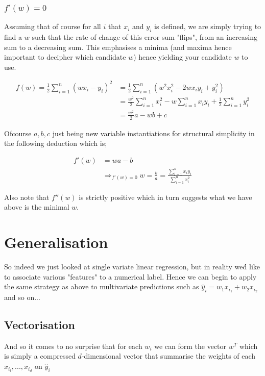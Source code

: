 \documentclass{article}
\begin{document}
\subsubsection*{$f'(w) = 0$}
Assuming that of course for all $i$ that $x_i$ and $y_i$ is defined, we are simply trying to find a $w$ such that the rate of change of this error sum "flips", from an increasing sum to a decreasing sum. This emphasises a minima (and maxima hence important to decipher which candidate $w$) hence yielding your candidate $w$ to use.

\begin{align*}
	f(w) = \frac{1}{2}\sum_{i=1}^{n}(wx_i-y_i)^2 &= \frac{1}{2}\sum_{i=1}^{n} (w^2x_i^2 - 2wx_iy_i + y_i^2) \\
																							 &= \frac{w^2}{2}\sum_{i=1}^{n}x_i^2 - w \sum_{i=1}^{n}x_iy_i + \frac{1}{2}\sum_{i=1}^{n}y_i^2 \\
																							 &= \frac{w^2}{2}a - wb + c
\end{align*}

Ofcourse $a,b,c$ just being new variable instantiations for structural simplicity in the following deduction which is; 

\begin{align*}
	f'(w) &= wa - b \\
				&\Rightarrow_{f'(w) = 0} w = \frac{b}{a} = \frac{\sum_{i=1}^{n}x_iy_i}{\sum_{i=1}^{n}x_i^2}
\end{align*}

Also note that $f''(w)$ is strictly positive which in turn suggests what we have above is the minimal $w$.

\section*{Generalisation}
So indeed we just looked at single variate linear regression, but in reality we\'d like to associate various "features" to a numerical label. Hence we can begin to apply the same strategy as above to multivariate predictions such as $\hat y_i = w_1x_{i_1} + w_2x_{i_2}$ and so on...

\subsection*{Vectorisation}
And so it comes to no surprise that for each $w_i$ we can form the vector $w^T$ which is simply a compressed $d$-dimensional vector that summarise the weights of each $x_{i_l}, ..., x_{i_d}$ on $\hat y_i$
\end{document}
